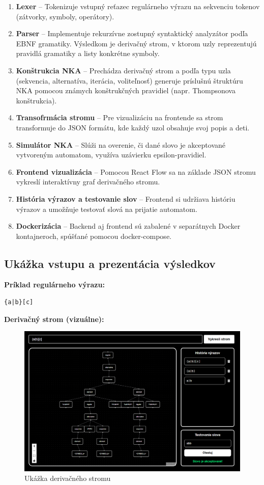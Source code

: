 \documentclass[a4paper,12pt]{article}
\begin{document}
\begin{enumerate}
    \item \textbf{Lexer} – Tokenizuje vstupný reťazec regulárneho výrazu na sekvenciu tokenov (zátvorky, symboly, operátory).
    \item \textbf{Parser} – Implementuje rekurzívne zostupný syntaktický analyzátor podľa EBNF gramatiky. Výsledkom je derivačný strom, v ktorom uzly reprezentujú pravidlá gramatiky a listy konkrétne symboly.
    \item \textbf{Konštrukcia NKA} – Prechádza derivačný strom a podľa typu uzla (sekvencia, alternatíva, iterácia, voliteľnosť) generuje príslušnú štruktúru NKA pomocou známych konštrukčných pravidiel (napr. Thompsonova konštrukcia).
    \item \textbf{Transofrmácia stromu} – Pre vizualizáciu na frontende sa strom transformuje do JSON formátu, kde každý uzol obsahuje svoj popis a deti.
    \item \textbf{Simulátor NKA} – Slúži na overenie, či dané slovo je akceptované vytvoreným automatom, využíva uzávierku epsilon-pravidiel.
    \item \textbf{Frontend vizualizácia} – Pomocou React Flow sa na základe JSON stromu vykreslí interaktívny graf derivačného stromu.
    \item \textbf{História výrazov a testovanie slov} – Frontend si udržiava históriu výrazov a umožňuje testovať slová na prijatie automatom.
    \item \textbf{Dockerizácia} – Backend aj frontend sú zabalené v separátnych Docker kontajneroch, spúšťané pomocou docker-compose.
\end{enumerate}

\subsection{Ukážka vstupu a prezentácia výsledkov}

\textbf{Príklad regulárneho výrazu:}
\begin{verbatim}
{a|b}[c]
\end{verbatim}

\textbf{Derivačný strom (vizuálne):}
\begin{figure}[H]
    \centering
    \includegraphics[width=1\linewidth]{tree.png}
    \caption{Ukážka derivačného stromu}
    \label{fig:tree}
\end{figure}
\end{document}
